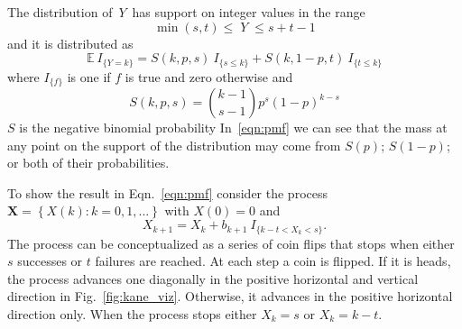 \documentclass[12pt]{article}         %
\begin{document}
The distribution of $\,Y\,$ has support on integer values in the range 
\begin{equation*}               
     \min(s,t) \leq \; Y \;\leq s+t-1  \label{range.y.eq}
\end{equation*}
and it is distributed as
\begin{equation} \label{eqn:pmf}
\mathbb{E}\  I_{\{Y=k\}} = S(k, p, s) \ I_{\{s \leq k\}} + 
  S(k, 1-p, t) \ I_{\{ t \leq k \}}
\end{equation}
where $I_{\{f\}}$ is one if $f$ is true and zero otherwise and
\begin{equation} \label{eqn:N}
S(k, p, s) = {k-1 \choose s-1} p^s (1-p)^{k-s} 
\end{equation}
$S$ is the negative binomial probability 
In~\ref{eqn:pmf} we can see that the mass at 
any point on the support of the distribution may come from $S(p)$; $S(1-p)$;
or both of their probabilities. 



To show the result in Eqn.~\ref{eqn:pmf} consider the 
process $\mathbf{X} = \left\{X(k) : k = 0,1,... \right\}$ 
with $X(0)=0$ and
\begin{equation*} \label{eqn:proc}
X_{k+1} = X_k + b_{k+1} \ I_{\{ k-t < X_k < s\}}.
\end{equation*}
The process can be conceptualized as a series of coin 
flips that stops when either $s$ successes or $t$ failures are reached. 
At each step a coin is flipped. If it is heads, the process advances 
one diagonally in the 
positive horizontal and vertical direction in Fig.~\ref{fig:kane_viz}. 
Otherwise, it advances in the positive horizontal direction only. When the 
process stops either $X_k = s$ or $X_k = k-t$. 
\end{document}
